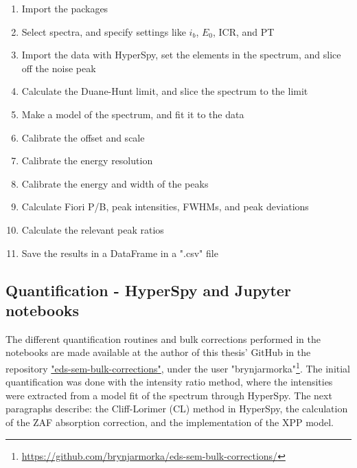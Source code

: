 \begin{enumerate}
    \item Import the packages
    \item Select spectra, and specify settings like $i_b$, $E_0$, ICR, and PT
    \item Import the data with HyperSpy, set the elements in the spectrum, and slice off the noise peak
    \item Calculate the Duane-Hunt limit, and slice the spectrum to the limit
    \item Make a model of the spectrum, and fit it to the data
    \item Calibrate the offset and scale
    \item Calibrate the energy resolution
    \item Calibrate the energy and width of the peaks
    \item Calculate Fiori P/B, peak intensities, FWHMs, and peak deviations
    \item Calculate the relevant peak ratios
    \item Save the results in a DataFrame in a ".csv" file
\end{enumerate}










\subsection{Quantification - HyperSpy and Jupyter notebooks}
\label{method:data_treatment:quantification}

The different quantification routines and bulk corrections performed in the notebooks are made available at the author of this thesis' GitHub in the repository \href{https://github.com/brynjarmorka/eds-sem-bulk-corrections}{"eds-sem-bulk-corrections"}, under the user "brynjarmorka"\footnote{\url{https://github.com/brynjarmorka/eds-sem-bulk-corrections/}}.
The initial quantification was done with the intensity ratio method, where the intensities were extracted from a model fit of the spectrum through HyperSpy.
The next paragraphs describe: the Cliff-Lorimer (CL) method in HyperSpy, the calculation of the ZAF absorption correction, and the implementation of the XPP model.

